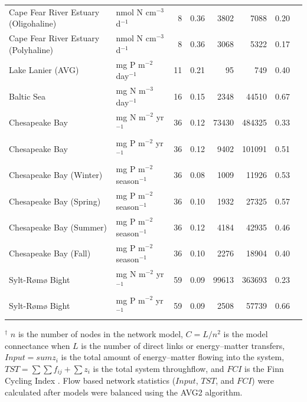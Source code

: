 \documentclass[article]{jss}
\begin{document}
\begin{table}[ht]
\begin{center}
\begin{tiny}
\begin{tabular}{llrrrrrr}
      Cape Fear River Estuary (Oligohaline) & nmol N cm$^{-3}$ d$^{-1}$ &   8 & 0.36 & 3802 & 7088 & 0.20 & \citet{hines12} \\
      Cape Fear River Estuary (Polyhaline) & nmol N cm$^{-3}$ d$^{-1}$ &   8 & 0.36 & 3068 & 5322 & 0.17 & \citet{hines2015} \\
      Lake Lanier (AVG) & mg P m$^{-2}$ day$^{-1}$ &  11 & 0.21 &  95 & 749 & 0.40 & \citet{borrett07_lanier} \\
      Baltic Sea & mg N m$^{-3}$ day$^{-1}$  &  16 & 0.15 & 2348 & 44510 & 0.67 & \citet{hinrichsen98_baltic} \\
      Chesapeake Bay & mg N m$^{-2}$ yr$^{-1}$  &  36 & 0.12 & 73430 & 484325 & 0.33 & \citet{baird95} \\
      Chesapeake Bay & mg P m$^{-2}$ yr$^{-1}$ &  36 & 0.12 & 9402 & 101091 & 0.51 & \citet{ulanowicz99} \\
      Chesapeake Bay (Winter) & mg P m$^{-2}$ season$^{-1}$ &  36 & 0.08 & 1009 & 11926 & 0.53 & \citet{ulanowicz99} \\
      Chesapeake Bay (Spring) & mg P m$^{-2}$ season$^{-1}$ &  36 & 0.10 & 1932 & 27325 & 0.57 & \citet{ulanowicz99} \\
      Chesapeake Bay (Summer) & mg P m$^{-2}$ season$^{-1}$ &  36 & 0.12 & 4184 & 42935 & 0.46 & \citet{ulanowicz99} \\
      Chesapeake Bay (Fall) & mg P m$^{-2}$ season$^{-1}$ &  36 & 0.10 & 2276 & 18904 & 0.40 & \citet{ulanowicz99} \\
      Sylt-R{\o}m{\o} Bight & mg N m$^{-2}$ yr$^{-1}$  &  59 & 0.09 & 99613 & 363693 & 0.23 & \citet{baird08_sylt} \\
      Sylt-R{\o}m{\o} Bight & mg P m$^{-2}$ yr$^{-1}$  &  59 & 0.09 & 2508 & 57739 & 0.66 & \citet{baird08_sylt} \\
      \hline
    \end{tabular}
  \end{tiny}
\end{center}
\begin{scriptsize}
  $^\dagger$ $n$ is the number of nodes in the network model,
  $C=L/n^2$ is the model connectance when $L$ is the number of direct
  links or energy--matter transfers, $Input =sum{z_i}$ is the total
  amount of energy--matter flowing into the system,
  $TST=\sum\sum{f_{ij}}+\sum{z_i}$ is the total system throughflow,
  and $FCI$ is the Finn Cycling Index \citep{finn80}. Flow based
  network statistics ($Input$, $TST$, and $FCI$) were calculated after
  models were balanced using the AVG2 algorithm.
\end{scriptsize}
\end{table}
\end{document}
